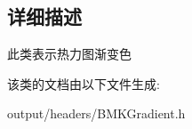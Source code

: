 \subsection{详细描述}
此类表示热力图渐变色 

该类的文档由以下文件生成\+:\begin{DoxyCompactItemize}
\item 
output/headers/B\+M\+K\+Gradient.\+h\end{DoxyCompactItemize}
